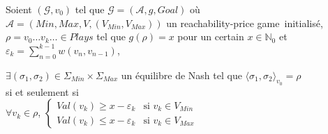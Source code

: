 \begin{propriete}
	\label{prop:question2}
	 Soient $(\mathcal{G},v_0)$ tel que $\mathcal{G} = (\mathcal{A}, g, Goal)$ où $\mathcal{A}= ({Min,Max}, V, (V_{Min},V_{Max}))$ un \og reachability-price game\fg~initialisé, $\rho = v_0 \ldots v_k \ldots \in Plays$ tel que $g(\rho) = x$ pour un certain $x \in \mathbb{N}_0$ et $\varepsilon_k = \sum_{n=0}^{k-1} w(v_n,v_{n-1})$,
	\begin{center} $\exists (\sigma_1, \sigma_2) \in \Sigma_{Min} \times \Sigma_{Max}$ un équilibre de Nash tel que $\langle \sigma_1, \sigma_2 \rangle_{v_0} = \rho$\\ $\text{}$ \\ si et seulement si \\ $\text{}$ \\
		$ \forall v_k \in \rho$,  $\begin{cases} Val(v_k) \geq x - \varepsilon _k & \text{si } v_k \in V_{Min} \\
		 									 Val(v_k) \leq x - \varepsilon _k &  \text{si } v_k \in V_{Max}\end{cases}$ \end{center}

\end{propriete}
\setcounter{equation}{0}


